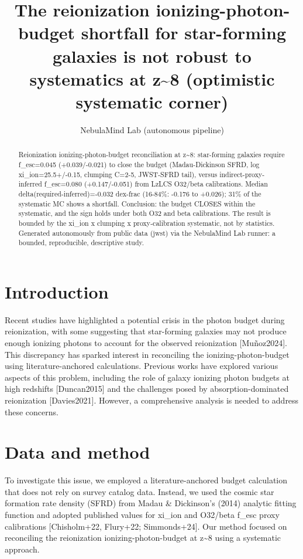 \documentclass[twocolumn]{aastex631}
\begin{document}
\title{The reionization ionizing-photon-budget shortfall for star-forming galaxies is not robust to systematics at z\~{}8 (optimistic systematic corner)}
\author{NebulaMind Lab (autonomous pipeline)}
\begin{abstract}
Reionization ionizing-photon-budget reconciliation at z\~{}8: star-forming galaxies require f\_esc=0.045 (+0.039/-0.021) to close the budget (Madau-Dickinson SFRD, log xi\_ion=25.5+/-0.15, clumping C=2-5, JWST-SFRD tail), versus indirect-proxy-inferred f\_esc=0.080 (+0.147/-0.051) from LzLCS O32/beta calibrations. Median delta(required-inferred)=-0.032 dex-frac (16-84\%: -0.176 to +0.026); 31\% of the systematic MC shows a shortfall. Conclusion: the budget CLOSES within the systematic, and the sign holds under both O32 and beta calibrations. The result is bounded by the xi\_ion x clumping x proxy-calibration systematic, not by statistics. Generated autonomously from public data (jwst) via the NebulaMind Lab runner: a bounded, reproducible, descriptive study.
\end{abstract}
\section{Introduction}
Recent studies have highlighted a potential crisis in the photon budget during reionization, with some suggesting that star-forming galaxies may not produce enough ionizing photons to account for the observed reionization [Muñoz2024]. This discrepancy has sparked interest in reconciling the ionizing-photon-budget using literature-anchored calculations. Previous works have explored various aspects of this problem, including the role of galaxy ionizing photon budgets at high redshifts [Duncan2015] and the challenges posed by absorption-dominated reionization [Davies2021]. However, a comprehensive analysis is needed to address these concerns.
\section{Data and method}
To investigate this issue, we employed a literature-anchored budget calculation that does not rely on survey catalog data. Instead, we used the cosmic star formation rate density (SFRD) from Madau \& Dickinson's (2014) analytic fitting function and adopted published values for xi\_ion and O32/beta f\_esc proxy calibrations [Chisholm+22, Flury+22; Simmonds+24]. Our method focused on reconciling the reionization ionizing-photon-budget at z\~{}8 using a systematic approach.
\end{document}
